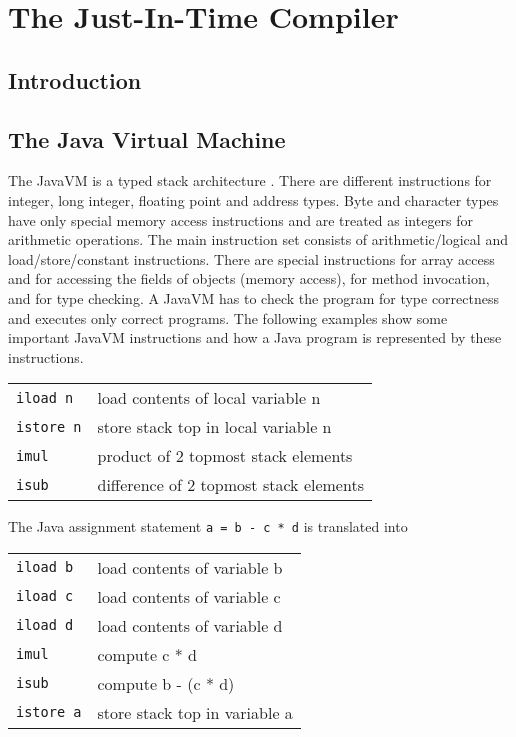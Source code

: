 \chapter{The Just-In-Time Compiler}

\section{Introduction}

\section{The Java Virtual Machine}

\label{chapjvm}

The JavaVM is a typed stack architecture \cite{javavm96}. There are
different instructions for integer, long integer, floating point and
address types. Byte and character types have only special memory access
instructions and are treated as integers for arithmetic operations. The
main instruction set consists of arithmetic/logical and load/store/constant
instructions. There are special instructions for array access and for
accessing the fields of objects (memory access), for method invocation,
and  for type checking. A JavaVM has to check the program for type
correctness and executes only correct programs. The following examples show
some important JavaVM instructions and how a Java program is represented by
these instructions.

\begin{tabular}{ll}
{\tt iload  n}& load contents of local variable n      \\
{\tt istore n}& store stack top in local variable n    \\
{\tt imul    }& product of 2 topmost stack elements    \\ 
{\tt isub    }& difference of 2 topmost stack elements \\
\end{tabular} 

The Java assignment statement {\tt a = b - c * d} is translated into

\begin{tabular}{ll}
{\tt iload b }& load contents of variable b   \\
{\tt iload c }& load contents of variable c   \\
{\tt iload d }& load contents of variable d   \\
{\tt imul    }& compute c * d                 \\
{\tt isub    }& compute b - (c * d)           \\
{\tt istore a}& store stack top in variable a \\
\end{tabular} 

